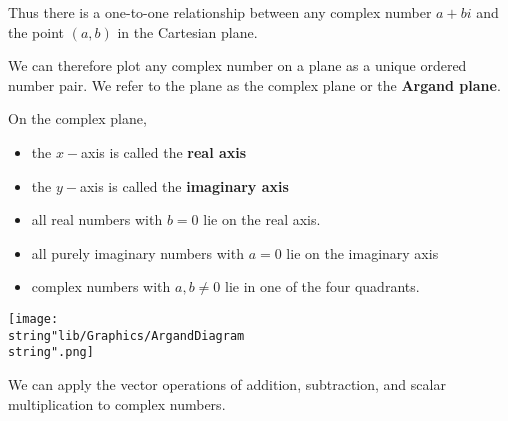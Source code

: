 \documentclass[11pt,a4paper]{book}
\begin{document}
Thus there is a one-to-one relationship between any complex number
$a+bi$ and the point $\left(a,b\right)$ in the Cartesian plane.

We can therefore plot any complex number on a plane as a unique ordered
number pair. We refer to the plane as the complex plane or the \textbf{Argand
plane}.

\medskip{}

\begin{minipage}[t]{0.6\textwidth}

On the complex plane,

\begin{itemize}

\item  the $x-$axis is called the \textbf{real axis}

\item  the $y-$axis is called the \textbf{imaginary axis}

\item  all real numbers with $b=0$ lie on the real axis.

\item  all purely imaginary numbers with $a=0$ lie on the imaginary
axis

\item  complex numbers with $a,b\neq0$ lie in one of the four quadrants.

\end{itemize}

\end{minipage}
\begin{minipage}[t]{0.1\textwidth}
\begin{center}
\texttt{[image: \\string"lib/Graphics/ArgandDiagram\\string".png]}
\par\end{center}

\end{minipage}

We can apply the vector operations of addition, subtraction, and scalar
multiplication to complex numbers.
\end{document}
